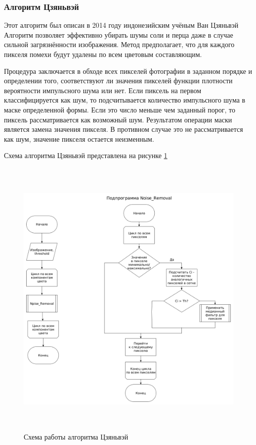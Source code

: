 \subsubsection{Алгоритм Цзяньвэй}
Этот алгоритм был описан в 2014 году индонезийским учёным Ван Цзяньвэй \cite{color_image}
Алгоритм позволяет эффективно убирать шумы соли и перца даже в случае сильной загрязнённости изображения.
Метод предполагает, что для каждого пикселя помехи будут удалены по всем цветовым составляющим.

Процедура заключается в обходе всех пикселей фотографии в заданном порядке и определении того, соответствуют ли значения пикселей функции плотности вероятности импульсного шума или нет. 
Если пиксель на первом классифицируется как шум, то подсчитывается количество импульсного шума в маске определенной формы. 
Если это число меньше чем заданный порог, то пиксель рассматривается как возможный шум. 
Результатом операции маски является замена значения пикселя.
В противном случае это не рассматривается как шум, значение пикселя остается неизменным.

Схема алгоритма Цзяньвэй представлена на рисунке \ref{fig::china}
\FloatBarrier
\begin{figure}[h]	
	\begin{center}
		\includegraphics[height=14cm]{inc/png/china.png}
	\end{center}
	\captionsetup{justification=centering}
	\caption{Схема работы алгоритма Цзяньвэй}
	\label{fig::china}
\end{figure}
\FloatBarrier
